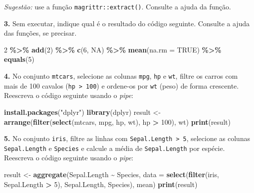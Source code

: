 \documentclass[
  portuguese,
  11pt,
  openany]{book}
\newenvironment{Shaded}{\begin{snugshade}}{\end{snugshade}}
\newcommand{\AttributeTok}[1]{\textcolor[rgb]{0.13,0.29,0.53}{#1}}
\newcommand{\ConstantTok}[1]{\textcolor[rgb]{0.56,0.35,0.01}{#1}}
\newcommand{\DecValTok}[1]{\textcolor[rgb]{0.00,0.00,0.81}{#1}}
\newcommand{\FunctionTok}[1]{\textcolor[rgb]{0.13,0.29,0.53}{\textbf{#1}}}
\newcommand{\NormalTok}[1]{#1}
\newcommand{\OtherTok}[1]{\textcolor[rgb]{0.56,0.35,0.01}{#1}}
\newcommand{\SpecialCharTok}[1]{\textcolor[rgb]{0.81,0.36,0.00}{\textbf{#1}}}
\newcommand{\StringTok}[1]{\textcolor[rgb]{0.31,0.60,0.02}{#1}}
\begin{document}
\emph{Sugestão:} use a função \texttt{magrittr::extract()}. Consulte a ajuda da função.

\textbf{3.} Sem executar, indique qual é o resultado do código seguinte. Consulte a ajuda
das funções, se precisar.

\begin{Shaded}
\begin{Highlighting}[]
\DecValTok{2} \SpecialCharTok{\%\textgreater{}\%}
  \FunctionTok{add}\NormalTok{(}\DecValTok{2}\NormalTok{) }\SpecialCharTok{\%\textgreater{}\%}
  \FunctionTok{c}\NormalTok{(}\DecValTok{6}\NormalTok{, }\ConstantTok{NA}\NormalTok{) }\SpecialCharTok{\%\textgreater{}\%}
  \FunctionTok{mean}\NormalTok{(}\AttributeTok{na.rm =} \ConstantTok{TRUE}\NormalTok{) }\SpecialCharTok{\%\textgreater{}\%}
  \FunctionTok{equals}\NormalTok{(}\DecValTok{5}\NormalTok{)}
\end{Highlighting}
\end{Shaded}

\textbf{4.} No conjunto \texttt{mtcars}, selecione as colunas \texttt{mpg}, \texttt{hp} e \texttt{wt}, filtre os
carros com mais de 100 cavalos (\texttt{hp\ \textgreater{}\ 100}) e ordene-os por \texttt{wt} (peso) de forma
crescente. Reescreva o código seguinte usando o \emph{pipe}:

\begin{Shaded}
\begin{Highlighting}[]
\FunctionTok{install.packages}\NormalTok{(}\StringTok{"dplyr"}\NormalTok{)}
\FunctionTok{library}\NormalTok{(dplyr)}
\NormalTok{result }\OtherTok{\textless{}{-}} \FunctionTok{arrange}\NormalTok{(}\FunctionTok{filter}\NormalTok{(}\FunctionTok{select}\NormalTok{(mtcars, mpg, hp, wt), hp }\SpecialCharTok{\textgreater{}} \DecValTok{100}\NormalTok{), wt)}
\FunctionTok{print}\NormalTok{(result)}
\end{Highlighting}
\end{Shaded}

\textbf{5.} No conjunto \texttt{iris}, filtre as linhas com \texttt{Sepal.Length\ \textgreater{}\ 5}, selecione as
colunas \texttt{Sepal.Length} e \texttt{Species} e calcule a média de \texttt{Sepal.Length} por espécie.
Reescreva o código seguinte usando o \emph{pipe}:

\begin{Shaded}
\begin{Highlighting}[]
\NormalTok{result }\OtherTok{\textless{}{-}} \FunctionTok{aggregate}\NormalTok{(Sepal.Length }\SpecialCharTok{\textasciitilde{}}\NormalTok{ Species,}
                    \AttributeTok{data =} \FunctionTok{select}\NormalTok{(}\FunctionTok{filter}\NormalTok{(iris, Sepal.Length }\SpecialCharTok{\textgreater{}} \DecValTok{5}\NormalTok{),}
\NormalTok{                                  Sepal.Length, Species),}
\NormalTok{                    mean)}
\FunctionTok{print}\NormalTok{(result)}
\end{Highlighting}
\end{Shaded}
\end{document}
